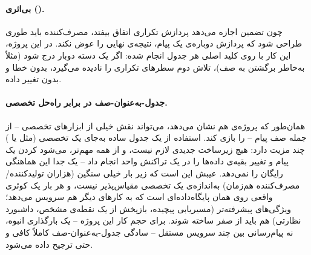 \paragraph{بی‌اثری ().} چون تضمین  اجازه می‌دهد پردازش تکراری اتفاق بیفتد، مصرف‌کننده باید طوری طراحی شود که پردازش دوباره‌ی یک پیام، نتیجه‌ی نهایی را عوض نکند. در این پروژه، این کار با  روی کلید اصلی هر جدول انجام شده: اگر یک دسته دوبار درج شود (مثلاً به‌خاطر برگشتن به صف)، تلاش دوم سطرهای تکراری را نادیده می‌گیرد، بدون خطا و بدون تغییر داده.

\paragraph{جدول-به‌عنوان-صف در برابر راه‌حل تخصصی.} همان‌طور که پروژه‌ی  \cite{pgeverything} هم نشان می‌دهد،  می‌تواند نقش خیلی از ابزارهای تخصصی -- از جمله صف پیام -- را بازی کند. استفاده از یک جدول ساده به‌جای یک  تخصصی (مثل  یا ) چند مزیت دارد: هیچ زیرساخت جدیدی لازم نیست، و از همه مهم‌تر، می‌شود  کردن یک پیام و تغییر بقیه‌ی داده‌ها را در یک تراکنش واحد انجام داد -- یک  جدا این هماهنگی رایگان را نمی‌دهد. عیبش این است که زیر بار خیلی سنگین (هزاران تولیدکننده/مصرف‌کننده هم‌زمان) به‌اندازه‌ی یک  تخصصی مقیاس‌پذیر نیست، و هر بار  یک کوئری واقعی روی همان پایگاه‌داده‌ای است که به کارهای دیگر هم سرویس می‌دهد؛ ویژگی‌های پیشرفته‌تر (مسیریابی پیچیده، بازپخش از یک نقطه‌ی مشخص، داشبورد نظارتی) هم باید از صفر ساخته شوند. برای حجم کار این پروژه -- یک بارگذاری انبوه، نه پیام‌رسانی بین چند سرویس مستقل -- سادگی جدول-به‌عنوان-صف کاملاً کافی و حتی ترجیح داده می‌شود.
